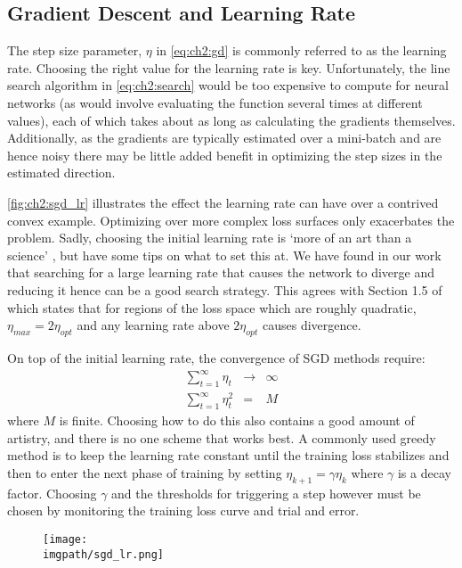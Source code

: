 \subsection{Gradient Descent and Learning Rate}
The step size parameter, $\eta$ in \eqref{eq:ch2:gd} is commonly referred to as
the learning rate. Choosing the right value for the learning rate is key.
Unfortunately, the line search algorithm in \eqref{eq:ch2:search} would be too
expensive to compute for neural networks (as would involve evaluating the
function several times at different values), each of which takes about as long
as calculating the gradients themselves. Additionally, as the gradients are
typically estimated over a mini-batch and are hence noisy there may be
little added benefit in optimizing the step sizes in the estimated direction. 

\autoref{fig:ch2:sgd_lr} illustrates the effect the learning rate can have over
a contrived convex example. Optimizing over more complex loss surfaces only
exacerbates the problem. Sadly, choosing the initial learning rate is 
`more of an art than a science' \cite{goodfellow_deep_2016}, but
\cite{bottou_stochastic_2012, montavon_neural_2012} have some tips on what to
set this at. We have found in our work that searching for a large learning 
rate that causes the network to diverge and reducing it hence can be a good
search strategy. This agrees with Section 1.5 of \cite{lecun_efficient_2012}
which states that for regions of the loss space which are roughly quadratic,
$\eta_{max} = 2\eta_{opt}$ and any learning rate above $2\eta_{opt}$ causes
divergence.

On top of the initial learning rate, the convergence of SGD methods require:
\begin{eqnarray}
  \sum_{t=1}^{\infty} \eta_t &\rightarrow &\infty \\
  \sum_{t=1}^{\infty} \eta_t^2 &=& M
\end{eqnarray}
where $M$ is finite. Choosing how to do this also contains a good amount of artistry,
and there is no one scheme that works best. A commonly used greedy method is to
keep the learning rate constant until the training loss stabilizes and then to
enter the next phase of training by setting $\eta_{k+1} = \gamma \eta_{k}$ where
$\gamma$ is a decay factor. Choosing $\gamma$ and the thresholds for triggering
a step however must be chosen by monitoring the training loss curve and trial
and error.

\begin{figure}[t]
  \centering
  \texttt{[image: \\imgpath/sgd\_lr.png]}
  \label{fig:ch2:sgd_lr}
\end{figure}

